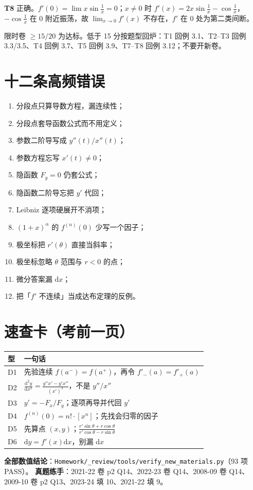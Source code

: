 \documentclass[11pt,a4paper]{ctexart}
\newcommand{\D}{\mathrm{d}}
\begin{document}
\textbf{T8} 正确。$f'(0)=\lim x\sin\frac1x=0$；$x\ne0$ 时 $f'(x)=2x\sin\frac1x-\cos\frac1x$，$-\cos\frac1x$ 在 $0$ 附近振荡，故 $\lim_{x\to0}f'(x)$ 不存在，$f'$ 在 $0$ 处为第二类间断。

\begin{warnbox}[验收线]
限时卷 $\ge 15/20$ 为达标。低于 15 分按题型回炉：T1 回例 3.1、T2--T3 回例 3.3/3.5、T4 回例 3.7、T5 回例 3.9、T7--T8 回例 3.12；不要开新卷。
\end{warnbox}

\section{十二条高频错误}

\begin{enumerate}[label=\arabic*.,leftmargin=2em]
\item 分段点只算导数方程，漏连续性；\item 分段点套导函数公式而不用定义；
\item 参数二阶导写成 $y''(t)/x''(t)$；\item 参数方程忘写 $x'(t)\ne0$；
\item 隐函数 $F_y=0$ 仍套公式；\item 隐函数二阶导忘把 $y'$ 代回；
\item Leibniz 逐项硬展开不消项；\item $(1+x)^\alpha$ 的 $f^{(n)}(0)$ 少写一个因子；
\item 极坐标把 $r'(\theta)$ 直接当斜率；\item 极坐标忽略 $\theta$ 范围与 $r<0$ 的点；
\item 微分答案漏 $\D x$；\item 把「$f'$ 不连续」当成达布定理的反例。
\end{enumerate}

\section{速查卡（考前一页）}

\begin{center}
\begin{tabularx}{15.2cm}{@{}l X@{}}
\toprule
型 & 一句话 \\
\midrule
D1 & 先验连续 $f(a^-)=f(a^+)$，再令 $f'_-(a)=f'_+(a)$ \\
D2 & $\frac{\D^2 y}{\D x^2}=\frac{y''x'-y'x''}{(x')^3}$，不是 $y''/x''$ \\
D3 & $y'=-F_x/F_y$；逐项再导并代回 $y'$ \\
D4 & $f^{(n)}(0)=n!\cdot[x^n]$；先找会归零的因子 \\
D5 & 先算点 $(x,y)$；$\frac{r'\sin\theta+r\cos\theta}{r'\cos\theta-r\sin\theta}$ \\
D6 & $\D y=f'(x)\D x$，别漏 $\D x$ \\
\bottomrule
\end{tabularx}
\end{center}

\vspace{4pt}
\noindent\textbf{全部数值结论}：\texttt{Homework/\_review/tools/verify\_new\_materials.py}（93 项 PASS）。
\textbf{真题练手}：2021-22 卷 p2 Q14、2022-23 卷 Q14、2008-09 卷 Q14、2009-10 卷 p2 Q13、2023-24 填 10、2021-22 填 9。
\end{document}
